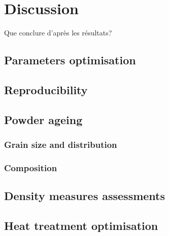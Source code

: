 \chapter{Discussion}
\label{Chap5}
Que conclure d'après les résultats?

\section{Parameters optimisation}

\section{Reproducibility}

\section{Powder ageing}



\subsection{Grain size and distribution}

\subsection{Composition}
\section{Density measures assessments}
\section{Heat treatment optimisation}

